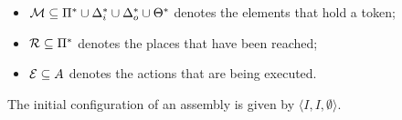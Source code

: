 \begin{itemize}
  \item $\mathcal{M} \subseteq \Pi^{*} \cup
    \Delta_{i}^{*}\cup\Delta_{o}^{*}\cup\Theta^{*}$ denotes the
    elements that hold a token;
  \item $\mathcal{R} \subseteq \Pi^*$ denotes the places that have been
    reached;
  \item $\mathcal{E} \subseteq A$ denotes the actions that are being executed.
\end{itemize}

The initial configuration of an assembly is given by $\langle I, I,
\emptyset\rangle$.








